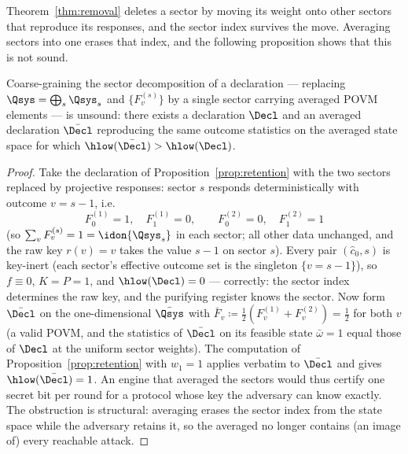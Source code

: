 
Theorem~\ref{thm:removal} deletes a sector by moving its weight onto other
sectors that reproduce its responses, and the sector index survives the
move. Averaging sectors into one erases that index, and the following
proposition shows that this is not sound.

\begin{proposition}\label{prop:no-averaging}
Coarse-graining the sector decomposition of a declaration --- replacing
$\Qsys=\bigoplus_s\Qsys_s$ and $\{F^{(s)}_v\}$ by a single sector carrying
averaged POVM elements --- is unsound: there exists a declaration
$\Decl$ and an averaged declaration $\bar\Decl$ reproducing the same
outcome statistics on the averaged state space for which
$\hlow(\bar\Decl)>\hlow(\Decl)$.
\end{proposition}

\begin{proof}
Take the declaration of Proposition~\ref{prop:retention} with the two
sectors replaced by projective responses: sector $s$ responds
deterministically with outcome $v=s-1$, i.e.
\begin{equation*}
  F^{(1)}_0=1,\quad F^{(1)}_1=0,\qquad
  F^{(2)}_0=0,\quad F^{(2)}_1=1
\end{equation*}
(so $\sum_vF^{(s)}_v=1=\idon{\Qsys_s}$ in each sector; all other data
unchanged, and the raw key $r(v)=v$ takes the value $s-1$ on sector
$s$). Every pair
$(\hat c_0,s)$ is key-inert (each sector's effective outcome set is the
singleton $\{v=s-1\}$), so $f\equiv0$, $K=P=1$, and
$\hlow(\Decl)=0$ --- correctly: the sector index determines the raw key,
and the purifying register knows the sector. Now form $\bar\Decl$ on the
one-dimensional $\bar\Qsys$ with
$\bar F_v\coloneqq\tfrac12(F^{(1)}_v+F^{(2)}_v)=\tfrac12$ for both $v$
(a valid POVM, and the statistics of $\bar\Decl$ on its feasible state
$\bar\omega=1$ equal those of $\Decl$ at the uniform sector weights).
The computation of Proposition~\ref{prop:retention} with $w_1=1$ applies
verbatim to $\bar\Decl$ and gives $\hlow(\bar\Decl)=1$. An engine that
averaged the sectors would thus certify one secret bit per round for a
protocol whose key the adversary can know exactly. The obstruction is
structural: averaging erases the sector index from the state space while
the adversary retains it, so the averaged  no longer
contains (an image of) every reachable attack.
\end{proof}
